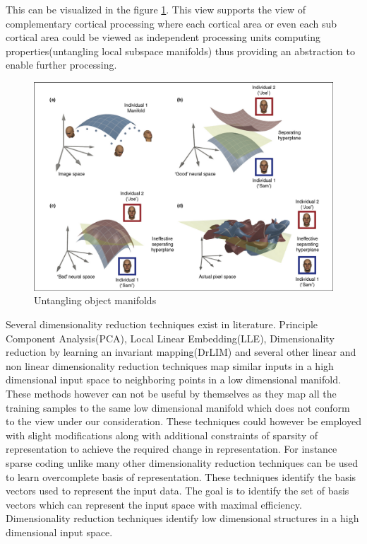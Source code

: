 \documentclass[12pt,twoside]{article}
\theoremstyle{plain}
\theoremstyle{definition}
\theoremstyle{remark}
\begin{document}
This can be visualized in the figure \ref{fig:Untangle}. This view supports the view of complementary cortical processing where each cortical area or even each sub cortical area could be viewed as independent processing units computing properties(untangling local subspace manifolds) thus providing an abstraction to enable further processing.  
\begin{figure}[h]
\begin{center}
\includegraphics[scale=0.3]{manifolds}
\end{center}
\caption{Untangling object manifolds \cite{JamesJ.DiCarlo2007} }
\label{fig:Untangle}
\end{figure}
Several dimensionality reduction techniques exist in literature. Principle Component Analysis(PCA), Local Linear Embedding(LLE), Dimensionality reduction by learning an invariant mapping(DrLIM) and several other linear and non linear dimensionality reduction techniques map similar inputs in a high dimensional input space to neighboring points in a low dimensional manifold. These methods however can not be useful by themselves as they map all the training samples to the same low dimensional manifold which does not conform to the view under our consideration. These techniques could however be employed with slight modifications along with additional constraints of sparsity of representation to achieve the required change in representation. For instance sparse coding unlike many other dimensionality reduction techniques can be used to learn overcomplete basis of representation. These techniques identify the basis vectors used to represent the input data. The goal is to identify the set of basis vectors which can represent the input space with maximal efficiency. Dimensionality reduction techniques identify low dimensional structures in a high dimensional input space. 
\end{document}
